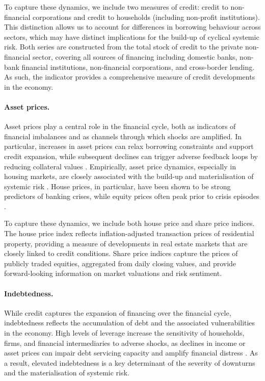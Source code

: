 To capture these dynamics, we include two measures of credit: credit to non-financial corporations and credit to households (including non-profit institutions). This distinction allows us to account for differences in borrowing behaviour across sectors, which may have distinct implications for the build-up of cyclical systemic risk. Both series are constructed from the total stock of credit to the private non-financial sector, covering all sources of financing including domestic banks, non-bank financial institutions, non-financial corporations, and cross-border lending. As such, the indicator provides a comprehensive measure of credit developments in the economy.

\paragraph{Asset prices.}
Asset prices play a central role in the financial cycle, both as indicators of financial imbalances and as channels through which shocks are amplified. In particular, increases in asset prices can relax borrowing constraints and support credit expansion, while subsequent declines can trigger adverse feedback loops by reducing collateral values \citep{kiyotaki1997credit}. Empirically, asset price dynamics, especially in housing markets, are closely associated with the build-up and materialisation of systemic risk \citep{jorda2015leveraged, claessens2012business}. House prices, in particular, have been shown to be strong predictors of banking crises, while equity prices often peak prior to crisis episodes \citep{reinhart2013banking}.

To capture these dynamics, we include both house price and share price indices. The house price index reflects inflation-adjusted transaction prices of residential property, providing a measure of developments in real estate markets that are closely linked to credit conditions. Share price indices capture the prices of publicly traded equities, aggregated from daily closing values, and provide forward-looking information on market valuations and risk sentiment.

\paragraph{Indebtedness.}
While credit captures the expansion of financing over the financial cycle, indebtedness reflects the accumulation of debt and the associated vulnerabilities in the economy. High levels of leverage increase the sensitivity of households, firms, and financial intermediaries to adverse shocks, as declines in income or asset prices can impair debt servicing capacity and amplify financial distress \citep{adrian2010liquidity, brunnermeier2009market}. As a result, elevated indebtedness is a key determinant of the severity of downturns and the materialisation of systemic risk.

